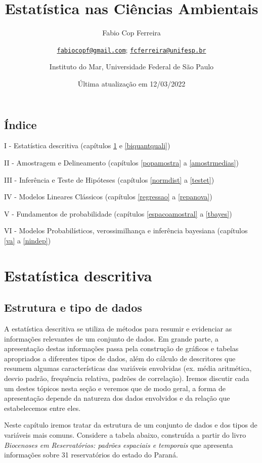 \documentclass[
]{book}
\title{Estatística nas Ciências Ambientais}
\author{Fabio Cop Ferreira \and \href{mailto:fabiocopf@gmail.com}{\nolinkurl{fabiocopf@gmail.com}}; \href{mailto:fcferreira@unifesp.br}{\nolinkurl{fcferreira@unifesp.br}} \and Instituto do Mar, Universidade Federal de São Paulo}
\date{Última atualização em 12/03/2022}
\begin{document}
\maketitle

{
\setcounter{tocdepth}{1}
\tableofcontents
}
\hypertarget{uxedndice}{%
\chapter*{Índice}\label{uxedndice}}

I - Estatística descritiva (capítulos \ref{estrdados} e \ref{biquantquali})

II - Amostragem e Delineamento (capítulos \ref{popamostra} a \ref{amostrmedias})

III - Inferência e Teste de Hipóteses (capítulos \ref{normdist} a \ref{testet})

IV - Modelos Lineares Clássicos (capítulos \ref{regressao} a \ref{repanova})

V - Fundamentos de probabilidade (capítulos \ref{espacoamostral} a \ref{tbayes})

VI - Modelos Probabilísticos, verossimilhança e inferência bayesiana (capítulos \ref{va} a \ref{nindep})

\hypertarget{part-estatuxedstica-descritiva}{%
\part{Estatística descritiva}\label{part-estatuxedstica-descritiva}}

\hypertarget{estrdados}{%
\chapter{Estrutura e tipo de dados}\label{estrdados}}

A estatística descritiva se utiliza de métodos para resumir e evidenciar as informações relevantes de um conjunto de dados. Em grande parte, a apresentação destas informações passa pela construção de gráficos e tabelas apropriados a diferentes tipos de dados, além do cálculo de descritores que resumem algumas características das variáveis envolvidas (ex. média aritmética, desvio padrão, frequência relativa, padrões de correlação). Iremos discutir cada um destes tópicos nesta seção e veremos que de modo geral, a forma de apresentação depende da natureza dos dados envolvidos e da relação que estabelecemos entre eles.

Neste capítulo iremos tratar da estrutura de um conjunto de dados e dos tipos de variáveis mais comuns. Considere a tabela abaixo, construída a partir do livro \emph{Biocenoses em Reservatórios: padrões espaciais e temporais} \citep{rodriguesetal2005} que apresenta informações sobre 31 reservatórios do estado do Paraná.
\end{document}
